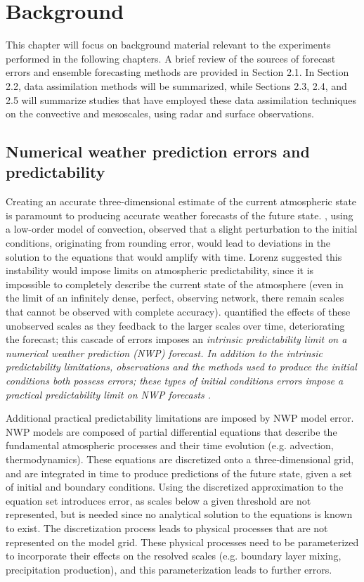 \chapter{Background}

This chapter will focus on background material relevant to the experiments performed in the following chapters. A brief review of the sources of forecast errors and ensemble forecasting methods are provided in Section 2.1. In Section 2.2, data assimilation methods will be summarized, while Sections 2.3, 2.4, and 2.5 will summarize studies that have employed these data assimilation techniques on the convective and mesoscales, using radar and surface observations. 

\section{Numerical weather prediction errors and predictability}
Creating an accurate three-dimensional estimate of the current atmospheric state is paramount to producing accurate weather forecasts of the future state. \citet{lorenz63}, using a low-order model of convection, observed that a slight perturbation to the initial conditions, originating from rounding error, would lead to deviations in the solution to the equations that would amplify with time. Lorenz suggested this instability would impose limits on atmospheric predictability, since it is impossible to completely describe the current state of the atmosphere (even in the limit of an infinitely dense, perfect, observing network, there remain scales that cannot be observed with complete accuracy). \citep{lorenz69} quantified the effects of these unobserved scales as they feedback to the larger scales over time, deteriorating the forecast; this cascade of errors imposes an \it{intrinsic} predictability limit on a numerical weather prediction (NWP) forecast. In addition to the intrinsic predictability limitations, observations and the methods used to produce the initial conditions both possess errors; these types of initial conditions errors impose a \it{practical} predictability limit on NWP forecasts \cite{melhauserzhang12}.

Additional practical predictability limitations are imposed by NWP model error. NWP models are composed of partial differential equations that describe the fundamental atmospheric processes and their time evolution (e.g. advection, thermodynamics). These equations are discretized onto a three-dimensional grid, and are integrated in time to produce predictions of the future state, given a set of initial and boundary conditions. Using the discretized approximation to the equation set introduces error, as scales below a given threshold are not represented, but is needed since no analytical solution to the equations is known to exist. The discretization process leads to physical processes that are not represented on the model grid. These physical processes need to be parameterized to incorporate their effects on the resolved scales (e.g. boundary layer mixing, precipitation production), and this parameterization leads to further errors.

